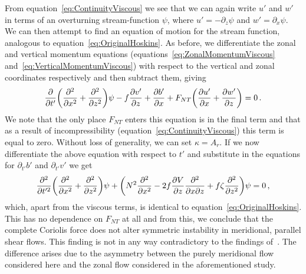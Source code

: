     From equation~\ref{eq:ContinuityViscous} we see that we can again write $u'$ and $w'$ in terms of an overturning stream-function $\psi$, where $u' = - \partial_z \psi$ and $w' = \partial_x \psi$. We can then attempt to find an equation of motion for the stream function, analogous to equation~\ref{eq:OriginalHoskins}. As before, we differentiate the zonal and vertical momentum equations (equations~\ref{eq:ZonalMomentumViscous} and~\ref{eq:VerticalMomentumViscous}) with respect to the vertical and zonal coordinates respectively and then subtract them, giving
    \begin{equation}
        \pdv{}{t'} \bigg( \pdv[2]{x} + \pdv[2]{z} \bigg) \psi - f \pdv{v'}{z} + \pdv{b'}{x} + F_{NT} \bigg( \pdv{u'}{x} + \pdv{w'}{z} \bigg) = 0 \, .
    \end{equation}
    We note that the only place $F_{NT}$ enters this equation is in the final term and that as a result of incompressibility (equation~\ref{eq:ContinuityViscous}) this term is equal to zero. Without loss of generality, we can set $\kappa = A_r$\footnotemark.
    If we now differentiate the above equation with respect to $t'$ and substitute in the equations for $\partial_{t'}b'$ and $\partial_{t'}v'$ we get
    \begin{equation}
        \frac{\partial^2}{\partial t'^2} \bigg(\pdv[2]{}{x} + \pdv[2]{}{z}\bigg) \psi + \bigg( N^2 \pdv[2]{}{x} - 2 f \pdv{V}{z} \pdv[2]{}{x}{z} + f \zeta \pdv[2]{}{z} \bigg) \psi = 0 \, ,
    \end{equation}
    which, apart from the viscous terms, is identical to equation~\ref{eq:OriginalHoskins}. This has no dependence on $F_{NT}$ at all and from this, we conclude that the complete Coriolis force does not alter symmetric instability in meridional, parallel shear flows. This finding is not in any way contradictory to the findings of~\citet{Zeitlin2018a}. The difference arises due to the asymmetry between the purely meridional flow considered here and the zonal flow considered in the aforementioned study.

